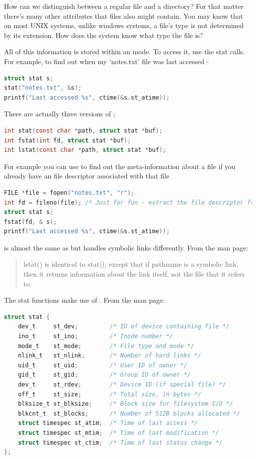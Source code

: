 How can we distinguish between a regular file and a directory? For that matter there's many other attributes that files also might contain. You may know that on most UNIX systems, unlike windows systems, a file's type is not determined by its extension. How does the system know what type the file is?

All of this information is stored within an inode. To access it, use the stat calls. For example, to find out when my `notes.txt' file was last accessed -

\begin{lstlisting}[language=C]
struct stat s;
stat("notes.txt", &s);
printf("Last accessed %s", ctime(&s.st_atime));
\end{lstlisting}

There are actually three versions of ;

\begin{lstlisting}[language=C]
int stat(const char *path, struct stat *buf);
int fstat(int fd, struct stat *buf);
int lstat(const char *path, struct stat *buf);
\end{lstlisting}

For example you can use  to find out the meta-information about a file if you already have an file descriptor associated with that file

\begin{lstlisting}[language=C]
FILE *file = fopen("notes.txt", "r");
int fd = fileno(file); /* Just for fun - extract the file descriptor from a C FILE struct */
struct stat s;
fstat(fd, & s);
printf("Last accessed %s", ctime(&s.st_atime));
\end{lstlisting}

 is almost the same as  but handles symbolic links differently. From the  man page:
\begin{quote}
lstat() is identical to stat(), except that if pathname is a symbolic link, then it returns information about the link itself, not the file that it refers to.
\end{quote}

The stat functions make use of . From the  man page:

\begin{lstlisting}[language=C]
struct stat {
    dev_t     st_dev;         /* ID of device containing file */
    ino_t     st_ino;         /* Inode number */
    mode_t    st_mode;        /* File type and mode */
    nlink_t   st_nlink;       /* Number of hard links */
    uid_t     st_uid;         /* User ID of owner */
    gid_t     st_gid;         /* Group ID of owner */
    dev_t     st_rdev;        /* Device ID (if special file) */
    off_t     st_size;        /* Total size, in bytes */
    blksize_t st_blksize;     /* Block size for filesystem I/O */
    blkcnt_t  st_blocks;      /* Number of 512B blocks allocated */
    struct timespec st_atim;  /* Time of last access */
    struct timespec st_mtim;  /* Time of last modification */
    struct timespec st_ctim;  /* Time of last status change */
};
\end{lstlisting}

